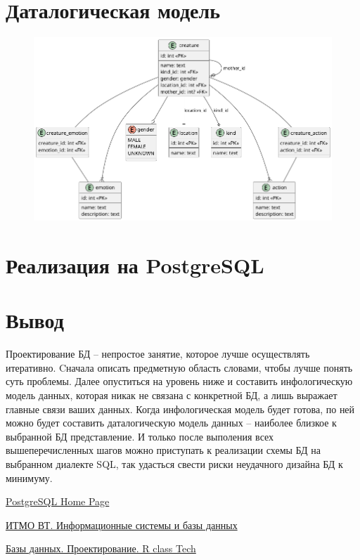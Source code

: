 \documentclass{article}
\begin{document}
\section{Даталогическая модель}

\begin{figure}[th]
    \includegraphics[scale=0.5]{./low-er-diagram.png}
    \centering
\end{figure}

\section{Реализация на PostgreSQL}



\section{Вывод}

Проектирование БД -- непростое занятие, которое
лучше осуществлять итеративно. Cначала
описать предметную область словами, чтобы лучше
понять суть проблемы. Далее опуститься на уровень
ниже и составить инфологическую модель данных,
которая никак не связана с конкретной БД, а
лишь выражает главные связи ваших данных.
Когда инфологическая модель будет готова,
по ней можно будет составить даталогическую
модель данных -- наиболее близкое к выбранной
БД представление. И только после выполения всех
вышеперечисленных шагов можно приступать
к реализации схемы БД на выбранном диалекте SQL,
так удасться свести риски неудачного дизайна БД
к минимуму.

\begin{thebibliography}{9}
    \item \href{https://www.postgresql.org}{
        PostgreSQL Home Page}

    \item \href{https://se.ifmo.ru/documents/10180/733702/isbd-2021-2.6.pdf/e47a2e01-d445-e017-070f-a300ecdb71a8}{
        ИТМО ВТ. Информационные системы и базы данных}

    \item \href{https://youtu.be/HnRXzrg3Sd4?si=Il3rxvHIpw93Wx0J}{
        Базы данных. Проектирование. R class Tech}
\end{thebibliography}
\end{document}
